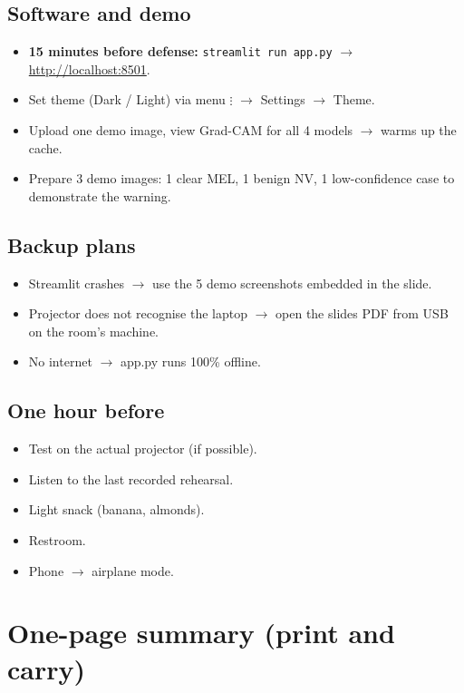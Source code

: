 \documentclass[11pt,a4paper]{article}
\begin{document}
\subsection{Software and demo}
\begin{itemize}[leftmargin=*, itemsep=2pt]
  \item \textbf{15 minutes before defense:} \texttt{streamlit run app.py} $\to$ \url{http://localhost:8501}.
  \item Set theme (Dark / Light) via menu $\vdots$ $\to$ Settings $\to$ Theme.
  \item Upload one demo image, view Grad-CAM for all 4 models $\to$ warms up the cache.
  \item Prepare 3 demo images: 1 clear MEL, 1 benign NV, 1 low-confidence case to demonstrate the warning.
\end{itemize}

\subsection{Backup plans}
\begin{itemize}[leftmargin=*, itemsep=2pt]
  \item Streamlit crashes $\to$ use the 5 demo screenshots embedded in the slide.
  \item Projector does not recognise the laptop $\to$ open the slides PDF from USB on the room's machine.
  \item No internet $\to$ app.py runs 100\% offline.
\end{itemize}

\subsection{One hour before}
\begin{itemize}[leftmargin=*, itemsep=2pt]
  \item Test on the actual projector (if possible).
  \item Listen to the last recorded rehearsal.
  \item Light snack (banana, almonds).
  \item Restroom.
  \item Phone $\to$ airplane mode.
\end{itemize}

\section{One-page summary (print and carry)}
\end{document}
